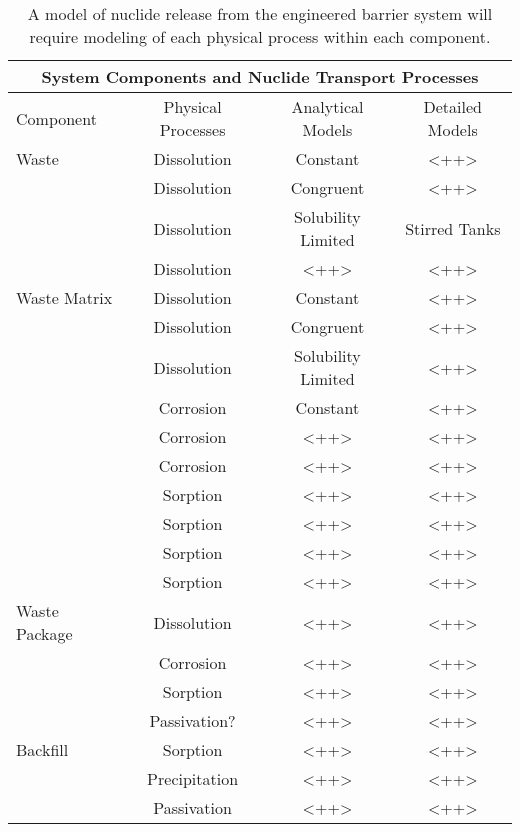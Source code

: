 %
\begin{table}
  \centering
  \footnotesize{
  \begin{tabular}{|l|c|c|c|}
    \multicolumn{4}{c}{\textbf{System Components and Nuclide Transport Processes}}\\
    \hline
    Component & Physical Processes & Analytical Models & Detailed Models\\ 
    \hline
    Waste        & Dissolution & Constant & <++> \\ 
                 & Dissolution & Congruent & <++> \\ 
                 & Dissolution & Solubility Limited & Stirred Tanks \\ 
                 & Dissolution & <++> & <++> \\ 
    \hline
    Waste Matrix & Dissolution & Constant &<++> \\ 
                 & Dissolution & Congruent &<++> \\ 
                 & Dissolution & Solubility Limited &<++> \\ 
                 & Corrosion   & Constant &<++> \\ 
                 & Corrosion   & <++> &<++> \\ 
                 & Corrosion   & <++> &<++> \\ 
                 & Sorption    & <++> &<++> \\ 
                 & Sorption    & <++> &<++> \\ 
                 & Sorption    & <++> &<++> \\ 
                 & Sorption    & <++> &<++> \\ 
    \hline
    Waste Package & Dissolution    & <++> &<++> \\ 
                  & Corrosion      & <++> &<++> \\ 
                  & Sorption       & <++> &<++> \\ 
                  & Passivation?   & <++> &<++> \\ 
    \hline
    Backfill & Sorption            & <++> &<++> \\ 
             & Precipitation       & <++> &<++> \\ 
             & Passivation         & <++> &<++> \\ 
    \hline
  \end{tabular}
  \caption[Nuclide Transport Processes]{A model of nuclide release from the engineered barrier 
  system will require modeling of each physical process within each component.}
  \label{tab:processes}
  }
\end{table}


